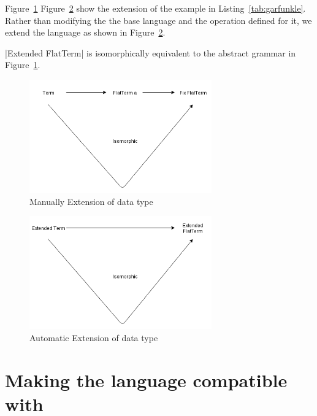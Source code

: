 \documentclass[thesis-solanki.tex]{subfiles}
\begin{document}
Figure~\ref{fig:manual-extension} Figure~\ref{fig:automatic-extension} show the extension of the example in Listing~\ref{tab:garfunkle}.
Rather than modifying the the base language and the operation defined for it, we extend the language as shown in 
Figure~\ref{fig:automatic-extension}. 

|Extended FlatTerm| is isomorphically equivalent to the abstract grammar in Figure~\ref{fig:manual-extension}.


\begin{figure}[H]
  \centering
  \includegraphics[scale=0.1, width=0.7\textwidth]{extended_data_type_1.png}
  \caption{Manually Extension of data type}
  \label{fig:manual-extension}
\end{figure}

\begin{figure}[H]
  \centering
  \includegraphics[width=0.7\textwidth, scale=0.1]{extended_data_type_2.png}
  \caption{Automatic Extension of data type}
  \label{fig:automatic-extension}
\end{figure}


\section{Making the language compatible with \protect{}}\label{sec:making-lang-comp}

\end{document}
